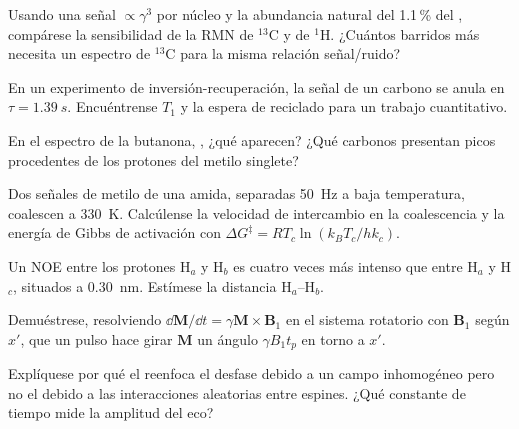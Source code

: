 \begin{exercise}[$\star\star$]\label{exo:b3:advanced-nmr:5}
Usando una señal $\propto\gamma^3$ por núcleo y la abundancia natural del 1.1\,\% del
, compárese la sensibilidad de la RMN de ${}^{13}$C y de ${}^1$H. ¿Cuántos barridos más
necesita un espectro de ${}^{13}$C para la misma relación señal/ruido?
\end{exercise}

\begin{exercise}[$\star\star$]\label{exo:b3:advanced-nmr:6}
En un experimento de inversión-recuperación, la señal de un carbono se anula en
$\tau = \qty{1.39}{s}$. Encuéntrense $T_1$ y la espera de reciclado para un trabajo cuantitativo.
\end{exercise}

\begin{exercise}[$\star\star$]\label{exo:b3:advanced-nmr:7}
En el espectro  de la butanona, , ¿qué  aparecen?
¿Qué carbonos presentan picos  procedentes de los protones del metilo singlete?
\end{exercise}

\begin{exercise}[$\star\star$]\label{exo:b3:advanced-nmr:8}
Dos señales de metilo de una amida, separadas \qty{50}{Hz} a baja temperatura, coalescen a
\qty{330}{K}. Calcúlense la velocidad de intercambio en la coalescencia y la energía de Gibbs de
activación con $\Delta G^\ddagger = RT_c\ln(k_BT_c/hk_c)$.
\end{exercise}

\begin{exercise}[$\star\star$]\label{exo:b3:advanced-nmr:9}
Un NOE entre los protones H$_a$ y H$_b$ es cuatro veces más intenso que entre H$_a$ y
H$_c$, situados a \qty{0.30}{nm}. Estímese la distancia H$_a$--H$_b$.
\end{exercise}

\begin{exercise}[$\star\star\star$]\label{exo:b3:advanced-nmr:10}
Demuéstrese, resolviendo $\dd\mathbf M/\dd t = \gamma\mathbf M\times\mathbf B_1$ en el sistema rotatorio
con $\mathbf B_1$ según $x'$, que un pulso hace girar $\mathbf M$ un ángulo $\gamma B_1t_p$ en torno a $x'$.
\end{exercise}

\begin{exercise}[$\star\star\star$]\label{exo:b3:advanced-nmr:11}
Explíquese por qué el  reenfoca el desfase debido a un campo
inhomogéneo pero no el debido a las interacciones aleatorias entre espines. ¿Qué constante
de tiempo mide la amplitud del eco?
\end{exercise}

